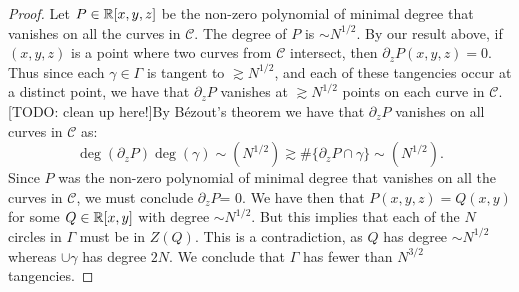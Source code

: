 \begin{proof}
    Let $P \in \mathbb R[x,y,z]$ be the non-zero polynomial of minimal degree that vanishes on all the curves in $\mathscr C$. The degree of $P$ is $\sim N^{1/2}$. 
    By our result above, if $(x,y,z)$ is a point where two curves from $\mathscr C$ intersect, then $\partial_z P (x,y,z)  =0 $. Thus since each $\gamma \in \Gamma$ is 
    tangent to $\gtrsim N^{1/2}$, and each of these tangencies occur at a distinct point, we have that $\partial_z P$ vanishes at $\gtrsim N^{1/2}$ points on each curve in $\mathscr C$.
    [TODO: clean up here!]By Bézout's theorem we have that $\partial_z P$ vanishes on all curves in $\mathscr{C}$ as:
    \[
    \deg (\partial_z P) \deg (\gamma) \sim  (N^{1/2}) \gtrsim \# \{\partial_z P \cap \gamma\} \sim (N^{1/2}) .    
    \] Since $P$ was the non-zero polynomial of minimal degree that vanishes on all the curves in $\mathscr C$, we must conclude 
    $\partial_z P$= 0. We have then that $P(x,y,z) = Q(x,y)$ for some $Q \in \mathbb R[x,y]$ with degree $\sim N^{1/2}$. 
    But this implies that each of the $N$ circles in $\Gamma$ must be in $Z(Q)$. This is a contradiction, as $Q$ has degree $\sim N^{1/2}$ whereas $\cup \gamma$ has degree $2N$.
    We conclude that $\Gamma$ has fewer than $N^{3/2}$ tangencies.



\end{proof}